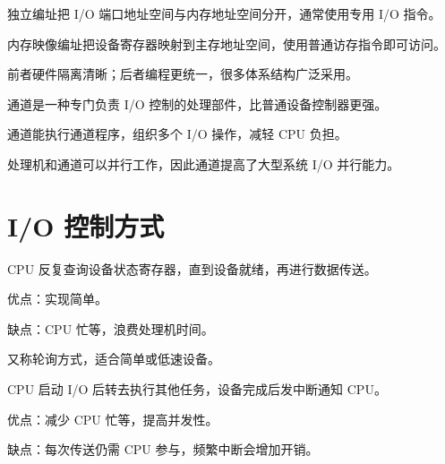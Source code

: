 \begin{points}
  \item 独立编址把 I/O 端口地址空间与内存地址空间分开，通常使用专用 I/O 指令。
  \item 内存映像编址把设备寄存器映射到主存地址空间，使用普通访存指令即可访问。
  \item 前者硬件隔离清晰；后者编程更统一，很多体系结构广泛采用。
\end{points}


\begin{points}
  \item 通道是一种专门负责 I/O 控制的处理部件，比普通设备控制器更强。
  \item 通道能执行通道程序，组织多个 I/O 操作，减轻 CPU 负担。
  \item 处理机和通道可以并行工作，因此通道提高了大型系统 I/O 并行能力。
\end{points}


\section{I/O 控制方式}
\begin{points}
  \item CPU 反复查询设备状态寄存器，直到设备就绪，再进行数据传送。
  \item 优点：实现简单。
  \item 缺点：CPU 忙等，浪费处理机时间。
  \item 又称轮询方式，适合简单或低速设备。
\end{points}


\begin{points}
  \item CPU 启动 I/O 后转去执行其他任务，设备完成后发中断通知 CPU。
  \item 优点：减少 CPU 忙等，提高并发性。
  \item 缺点：每次传送仍需 CPU 参与，频繁中断会增加开销。
\end{points}



